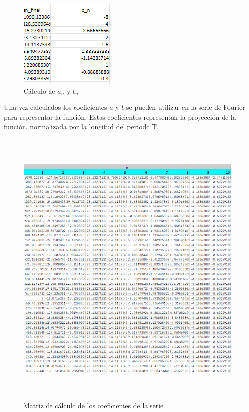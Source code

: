 \begin{figure}[H]
    \centering
    \includegraphics[width=1.84375in,height=1.69792in]{media/image1.png}
    \caption{Cálculo de \(a_n\) y \(b_n\)}        
\end{figure}

Una vez calculados los coeficientes \(a\) y \(b\) se pueden utilizar en la serie de Fourier para representar la función. Estos coeficientes representan la proyección de la función, normalizada por la longitud del periodo T.

\begin{figure}[H]
    \centering
    \includegraphics[width=5.5in,height=5.52745in]{media/image21.png}
    \caption{Matriz de cálculo de los coeficientes de la serie}
\end{figure}

